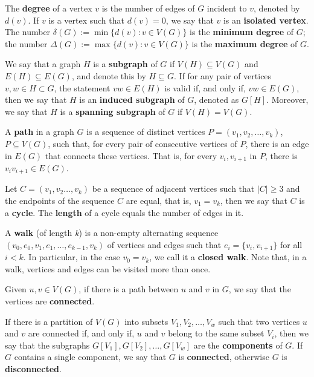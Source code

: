 The \textbf{degree} of a vertex \(v\) is the number of edges of \(G\) incident to \(v\), denoted by \(d(v)\). If \(v\) is a vertex such that \(d(v) = 0\), we say that \(v\) is an \textbf{isolated vertex}. The number \(\delta(G) := \min \{d(v) \colon v \in V(G)\}\) is the \textbf{minimum degree} of \(G\); the number \(\Delta(G) := \max \{d(v) \colon v \in V(G)\}\) is the \textbf{maximum degree} of \(G\).

We say that a graph \(H\) is a \textbf{subgraph} of \(G\) if \(V(H) \subseteq V(G)\) and \(E(H) \subseteq E(G)\), and denote this by \(H \subseteq G\). If for any pair of vertices \(v, w \in H \subset G\), the statement \(vw \in E(H)\) is valid if, and only if, \(vw \in E(G)\), then we say that \(H\) is an \textbf{induced subgraph} of \(G\), denoted as \(G[H]\). Moreover, we say that \(H\) is a \textbf{spanning subgraph} of \(G\) if \(V(H) = V(G)\).

A \textbf{path} in a graph \(G\) is a sequence of distinct vertices \(P = (v_1, v_2, \dots, v_k)\), \(P \subseteq V(G)\), such that, for every pair of consecutive vertices of \(P\), there is an edge in \(E(G)\) that connects these vertices. That is, for every \(v_i , v_{i+1}\) in \(P\), there is \(v_i v _{i+1} \in E(G)\).

Let \(C = (v_1, v_2 \dots, v_k)\) be a sequence of adjacent vertices such that \(|C| \geq 3\) and the endpoints of the sequence \(C\) are equal, that is, \(v_1 = v_k\), then we say that \(C\) is a \textbf{cycle}. The \textbf{length} of a cycle equals the number of edges in it. 

A \textbf{walk} (of length \textit{k}) is a non-empty alternating sequence \((v_0, e_0, v_1, e_1, \dots, e_{k-1}, v_k)\) of vertices and edges such that \(e_i = \{v_i, v_{i+1}\}\) for all \(i < k\). In particular, in the case \(v_0 = v_k\), we call it a \textbf{closed walk}. Note that, in a walk, vertices and edges can be visited more than once.

Given \(u, v \in V(G)\), if there is a path between \(u\) and \(v\) in \(G\), we say that the vertices are \textbf{connected}.

If there is a partition of \(V(G)\) into subsets \(V_1 , V_2 , \dots, V_w\) such that two vertices \(u\) and \(v\) are connected if, and only if, \(u\) and \(v\) belong to the same subset \(V_i\), then we say that the subgraphs \(G[V_1], G[V_2], \dots, G[V_w]\) are the \textbf{components} of \(G\). If \(G\) contains a single component, we say that \(G\) is \textbf{connected}, otherwise \(G\) is \textbf{disconnected}.

